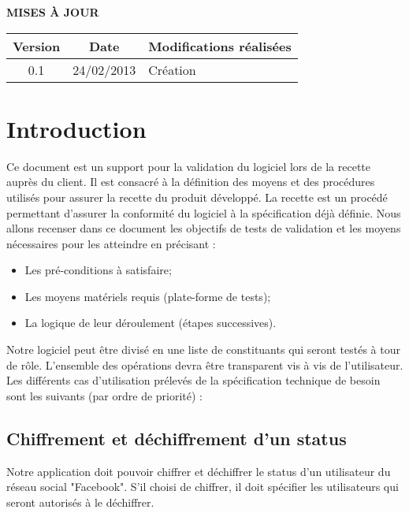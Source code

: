 \documentclass[a4paper,11pt,french]{article}
\begin{document}
\makeFirstPage
\clearpage

\vspace*{1cm}
\begin{center}
\textbf{\huge{MISES À JOUR}}\\
\vspace*{3cm}
\begin{tabularx}{16cm}{|c|c|X|}
\hline
\bfseries{Version} & \bfseries{Date} & \bfseries{Modifications réalisées}\\
\hline
0.1 & 24/02/2013 & Création\\
\hline
\end{tabularx}
\end{center}

\clearpage
\tableofcontents
\clearpage

\section{Introduction}

Ce document est un support pour la validation du logiciel lors de la recette
auprès du client. Il est consacré à la définition des moyens et des
procédures utilisés pour assurer la recette du produit développé. La recette
est un procédé permettant d’assurer la conformité du logiciel à la
spécification déjà définie. Nous allons recenser dans ce document les
objectifs de tests de validation et les moyens nécessaires pour les atteindre
en précisant :
\begin{itemize}
	\item Les pré-conditions à satisfaire;
	\item Les moyens matériels requis (plate-forme de tests);
	\item La logique de leur déroulement (étapes successives).
\end{itemize}
Notre logiciel peut être divisé en une liste de constituants qui seront
testés à tour de rôle. L'ensemble des opérations devra être transparent
vis à vis de l'utilisateur. Les différents cas d’utilisation prélevés
de la spécification technique de besoin sont les suivants (par ordre de
priorité) :

\subsection*{Chiffrement et déchiffrement d'un status}
Notre application doit pouvoir chiffrer et déchiffrer le status d'un
utilisateur du réseau social "Facebook". S'il choisi de chiffrer, il
doit spécifier les utilisateurs qui seront autorisés à le déchiffrer.
\end{document}
